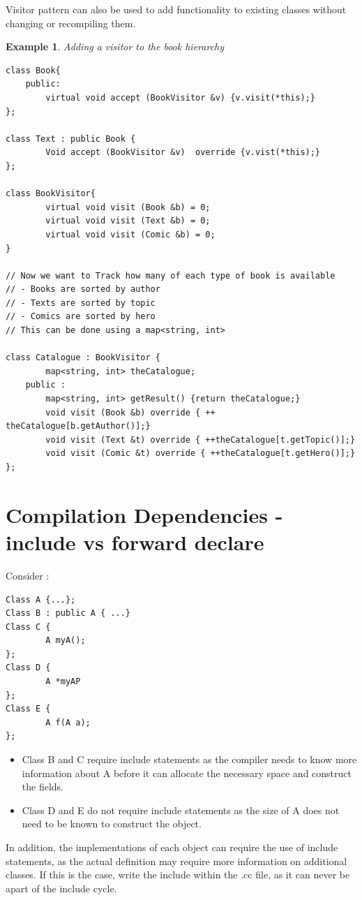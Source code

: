 \documentclass{article}
\newtheorem{ex}[theorem]{Example}
\begin{document}
Visitor pattern can also be used to add functionality to existing classes without changing or recompiling them.

\begin{ex} Adding a visitor to the book hierarchy\\
\begin{lstlisting}
class Book{
	public:
		virtual void accept (BookVisitor &v) {v.visit(*this);}
};

class Text : public Book {
		Void accept (BookVisitor &v)  override {v.vist(*this);}
};

class BookVisitor{
		virtual void visit (Book &b) = 0;
		virtual void visit (Text &b) = 0;
		virtual void visit (Comic &b) = 0;
}

// Now we want to Track how many of each type of book is available
// - Books are sorted by author
// - Texts are sorted by topic 
// - Comics are sorted by hero
// This can be done using a map<string, int>

class Catalogue : BookVisitor {
		map<string, int> theCatalogue;
	public :
		map<string, int> getResult() {return theCatalogue;}
		void visit (Book &b) override { ++ theCatalogue[b.getAuthor()];}
		void visit (Text &t) override { ++theCatalogue[t.getTopic()];}
		void visit (Comic &t) override { ++theCatalogue[t.getHero()];}
};
\end{lstlisting}
\end{ex}

\section{Compilation Dependencies - include vs forward declare}
Consider : 
\begin{lstlisting}
Class A {...};
Class B : public A { ...}
Class C {
		A myA();
};
Class D {
		A *myAP
};
Class E {
		A f(A a);
};
\end{lstlisting}

\begin{itemize}
\item Class B and C require include statements as the compiler needs to know more information about A before it can allocate the necessary space and construct the fields. 

\item Class D and E do not require include statements as the size of A does not need to be known to construct the object. 
\end{itemize}

In addition, the implementations of each object can require the use of include statements, as the actual definition may require more information on additional classes. If this is the case, write the include within the .cc file, as it can never be apart of the include cycle. 
\end{document}
